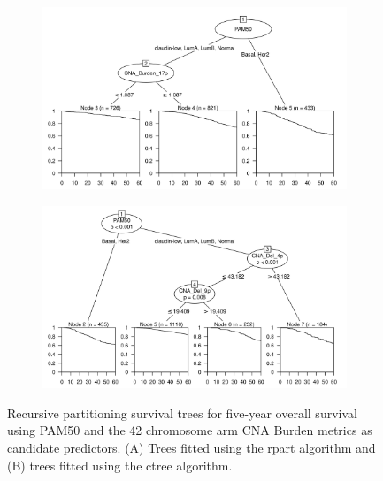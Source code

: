 \begin{figure}[!htb]
\centering

\vspace{0.5cm}

\begin{subfigure}{\textwidth}
\subcaption{}
\includegraphics[width=1\textwidth]{../figures/Appendices/Appendix_B/PA_PartyKit_Survival_Burden_FiveYearOS_PAM50.png}
\end{subfigure}

\vspace{2cm}

\begin{subfigure}{\textwidth}
\subcaption{}
\includegraphics[width=1\textwidth]{../figures/Appendices/Appendix_B/PA_Ctree_Survival_Burden_FiveYearOS_PAM50.png}
\end{subfigure}

\vspace{0.5cm}

\caption[Recursive partitioning survival trees for five-year overall survival using PAM50 and the 42 chromosome arm CNA Burden metrics as candidate predictors.]{Recursive partitioning survival trees for five-year overall survival using PAM50 and the 42 chromosome arm CNA Burden metrics as candidate predictors. (A) Trees fitted using the rpart algorithm and (B) trees fitted using the ctree algorithm.}
\end{figure}

